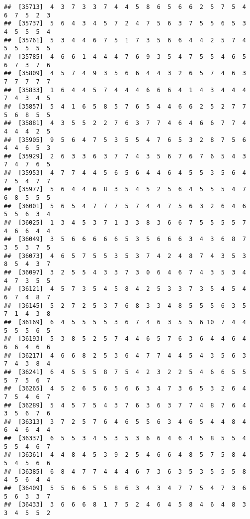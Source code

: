 \documentclass[
]{book}
\begin{document}
\begin{verbatim}
##  [35713]  4  3  7  3  3  7  4  4  5  8  6  5  6  6  2  5  7  5  4  6  7  5  2  3
##  [35737]  5  6  4  3  4  5  7  2  4  7  5  6  3  7  5  5  6  5  3  4  5  5  5  4
##  [35761]  5  3  4  4  6  7  5  1  7  3  5  6  6  4  4  2  5  7  4  5  5  5  5  5
##  [35785]  4  6  6  1  4  4  4  7  6  9  3  5  4  7  5  5  4  6  5  6  7  3  7  6
##  [35809]  4  5  7  4  9  3  5  6  6  4  4  3  2  6  5  7  4  6  3  7  7  7  7  7
##  [35833]  1  6  4  4  5  7  4  4  4  6  6  6  4  1  4  3  4  4  4  7  4  3  4  5
##  [35857]  5  4  1  6  5  8  5  7  6  5  4  4  6  6  2  5  2  7  7  5  6  8  5  5
##  [35881]  4  3  5  5  2  2  7  6  3  7  7  4  6  4  6  6  7  7  4  4  4  4  2  5
##  [35905]  9  5  6  4  7  5  3  5  5  4  7  6  5  3  2  8  7  5  6  4  4  6  5  3
##  [35929]  2  6  3  3  6  3  7  7  4  3  5  6  7  6  7  6  5  4  3  7  4  7  6  5
##  [35953]  4  7  7  4  4  5  6  5  6  4  4  6  4  5  5  3  5  6  4  7  5  4  7  7
##  [35977]  5  6  4  4  6  8  3  5  4  5  2  5  6  4  5  5  5  4  7  6  8  5  5  5
##  [36001]  5  6  5  4  7  7  7  5  7  4  4  7  5  6  3  2  6  4  6  5  5  6  3  4
##  [36025]  1  3  4  5  3  7  1  3  3  8  3  6  6  7  5  5  5  5  7  4  6  6  4  4
##  [36049]  3  5  6  6  6  6  6  5  3  5  6  6  6  3  4  3  6  8  7  3  5  3  7  5
##  [36073]  4  6  5  7  5  5  3  5  3  7  4  2  4  8  7  4  3  5  3  8  5  4  3  7
##  [36097]  3  2  5  5  4  3  3  7  3  0  6  4  6  7  4  3  5  3  4  4  7  3  5  5
##  [36121]  4  5  7  3  5  4  5  8  4  2  5  3  3  7  3  5  4  5  4  6  7  4  8  7
##  [36145]  5  2  7  2  5  3  7  6  8  3  3  4  8  5  5  5  6  3  5  7  1  4  3  8
##  [36169]  6  4  5  5  5  5  3  6  7  4  6  3  5  5  6 10  7  4  4  5  5  5  6  5
##  [36193]  5  3  8  5  2  5  7  4  4  6  5  7  6  3  6  4  4  6  4  6  6  4  6  6
##  [36217]  4  6  6  8  2  5  3  6  4  7  7  4  4  5  4  3  5  6  3  7  4  3  8  4
##  [36241]  6  4  5  5  5  8  7  5  4  2  3  2  2  5  4  6  6  5  5  5  7  5  6  7
##  [36265]  4  5  2  6  5  6  5  6  6  3  4  7  3  6  5  3  2  6  4  7  5  4  6  7
##  [36289]  5  4  5  7  5  4  3  7  6  3  6  3  7  7  4  8  7  6  4  3  5  6  7  6
##  [36313]  3  7  2  5  7  6  4  6  5  5  6  3  4  6  5  4  4  8  4  6  4  6  4  4
##  [36337]  6  5  5  3  4  5  3  5  3  6  6  4  6  4  5  8  5  5  4  5  5  4  6  7
##  [36361]  4  4  8  4  5  3  9  2  5  4  6  6  4  8  5  7  5  8  4  5  4  5  6  6
##  [36385]  6  8  4  7  7  4  4  4  6  7  3  6  3  5  3  5  5  5  8  4  5  6  4  4
##  [36409]  5  5  6  6  5  5  8  6  3  4  3  4  7  7  5  4  7  3  6  5  6  3  3  7
##  [36433]  3  6  6  6  8  1  7  5  2  4  6  4  5  8  4  6  4  8  3  3  4  5  5  2

\end{verbatim}
\end{document}
